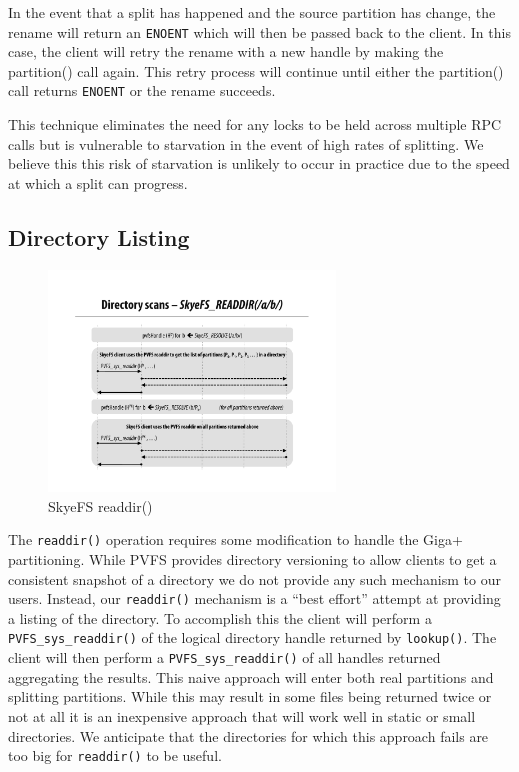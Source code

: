 \documentclass[twocolumn,letterpaper]{article}
\newcommand{\code}[1]{\texttt{#1}}
\begin{document}
In the event that a split has happened and the source partition has change, the
rename will return an \code{ENOENT} which will then be passed back to the client.  In
this case, the client will retry the rename with a new handle by making the
partition() call again.  This retry process will continue until either the
partition() call returns \code{ENOENT} or the rename succeeds.  

This technique eliminates the need for any locks to be held across multiple RPC
calls but is vulnerable to starvation in the event of high rates of splitting.
We believe this this risk of starvation is unlikely to occur in practice due to
the speed at which a split can progress.

\subsection{Directory Listing}
\begin{figure}
\begin{center}
\includegraphics[width=3in]{figure-readdir}
\end{center}
\caption{SkyeFS readdir()}
\end{figure}
The \code{readdir()} operation requires some modification to handle the Giga+
partitioning.  While PVFS provides directory versioning to allow clients to
get a consistent snapshot of a directory we do not provide any such mechanism
to our users.  Instead, our \code{readdir()} mechanism is a ``best effort'' attempt
at providing a listing of the directory.  To accomplish this the client will
perform a \code{PVFS\_sys\_readdir()} of the logical directory handle returned by
\code{lookup()}.  The client will then perform a \code{PVFS\_sys\_readdir()} of all handles
returned aggregating the results.  This naive approach will enter both real
partitions and splitting partitions.  While this may result in some files
being returned twice or not at all it is an inexpensive approach that will
work well in static or small directories.  We anticipate that the directories
for which this approach fails are too big for \code{readdir()} to be useful.
\end{document}
